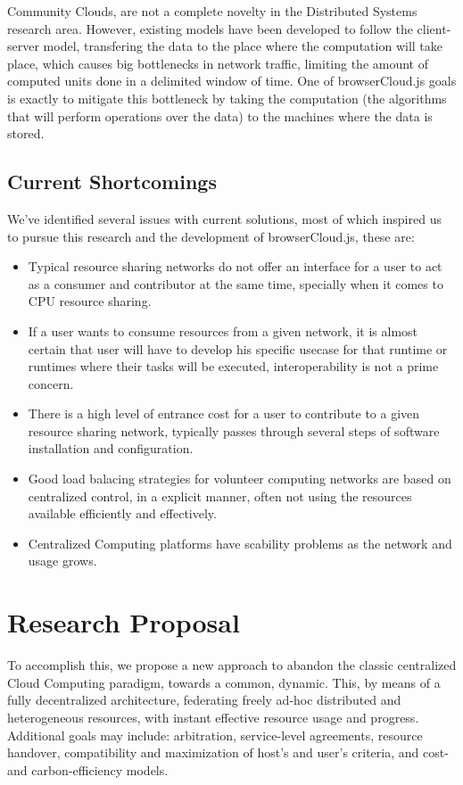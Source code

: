 Community Clouds\cite{Barraca2011}\cite{Navarro}, are not a complete novelty in the Distributed Systems research area. However, existing models have been developed to follow the client-server model, transfering the data to the place where the computation will take place, which causes big bottlenecks in network traffic, limiting the amount of computed units done in a delimited window of time. One of browserCloud.js goals is exactly to mitigate this bottleneck by taking the computation (the algorithms that will perform operations over the data) to the machines where the data is stored.


\subsection{Current Shortcomings}

We've identified several issues with current solutions, most of which inspired us to pursue this research and the development of browserCloud.js, these are:

\begin{itemize}
    \item Typical resource sharing networks do not offer an interface for a user to act as a consumer and contributor at the same time, specially when it comes to CPU resource sharing.
    \item If a user wants to consume resources from a given network, it is almost certain that user will have to develop his specific usecase for that runtime or runtimes where their tasks will be executed, interoperability is not a prime concern.
    \item There is a high level of entrance cost for a user to contribute to a given resource sharing network, typically passes through several steps of software installation and configuration.
    \item Good load balacing strategies for volunteer computing networks are based on centralized control, in a explicit manner, often not using the resources available efficiently and effectively.
    \item Centralized Computing platforms have scability problems as the network and usage grows.
\end{itemize}

\section{Research Proposal}

To accomplish this, we propose a new approach to abandon the classic centralized Cloud Computing paradigm, towards a common, dynamic. This, by means of a fully decentralized architecture, federating freely ad-hoc distributed and heterogeneous resources, with instant effective resource usage and progress. Additional goals may include: arbitration, service-level agreements, resource handover, compatibility and maximization of host's and user's criteria, and cost- and carbon-efficiency models.

